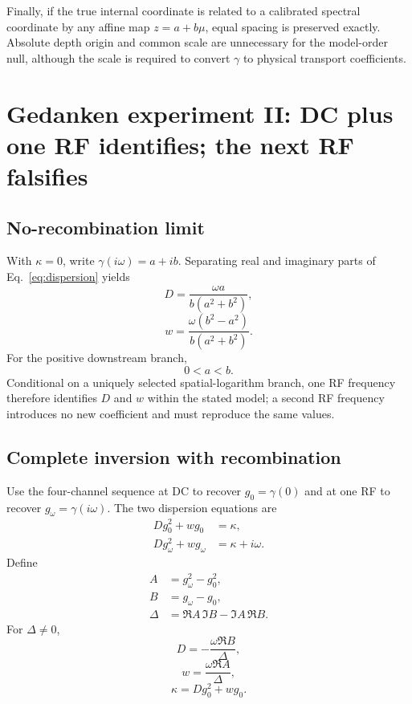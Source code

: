 \documentclass[11pt]{article}
\begin{document}
Finally, if the true internal coordinate is related to a calibrated spectral coordinate by any affine map $z=a+b\mu$, equal spacing is preserved exactly. Absolute depth origin and common scale are unnecessary for the model-order null, although the scale is required to convert $\gamma$ to physical transport coefficients.

\section{Gedanken experiment II: DC plus one RF identifies; the next RF falsifies}

\subsection{No-recombination limit}

With $\kappa=0$, write $\gamma(i\omega)=a+ib$. Separating real and imaginary parts of Eq.~\eqref{eq:dispersion} yields
\begin{equation}
\boxed{D=\frac{\omega a}{b(a^2+b^2)},}
\label{eq:Dsimple}
\end{equation}
\begin{equation}
\boxed{w=\frac{\omega(b^2-a^2)}{b(a^2+b^2)}.}
\label{eq:wsimple}
\end{equation}
For the positive downstream branch,
\begin{equation}
\boxed{0<a<b.}
\end{equation}
Conditional on a uniquely selected spatial-logarithm branch, one RF frequency therefore identifies $D$ and $w$ within the stated model; a second RF frequency introduces no new coefficient and must reproduce the same values.

\subsection{Complete inversion with recombination}

Use the four-channel sequence at DC to recover $g_0=\gamma(0)$ and at one RF to recover $g_\omega=\gamma(i\omega)$. The two dispersion equations are
\begin{align}
Dg_0^2+wg_0&=\kappa,\\
Dg_\omega^2+wg_\omega&=\kappa+i\omega.
\end{align}
Define
\begin{align}
A&=g_\omega^2-g_0^2,\\
B&=g_\omega-g_0,\\
\Delta&=\Re A\,\Im B-\Im A\,\Re B.
\end{align}
For $\Delta\neq0$,
\begin{equation}
\boxed{D=-\frac{\omega\Re B}{\Delta},}
\label{eq:Drecomb}
\end{equation}
\begin{equation}
\boxed{w=\frac{\omega\Re A}{\Delta},}
\label{eq:wrecomb}
\end{equation}
\begin{equation}
\boxed{\kappa=Dg_0^2+wg_0.}
\label{eq:krecomb}
\end{equation}
\end{document}
